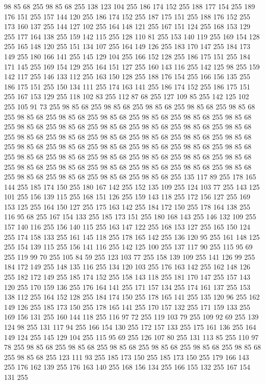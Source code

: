 98 85 68 255 98 85 68 255 138 123 104 255 186 174 152 255 188 177 154 255 189 176 151 255 157 144 120 255 186 174 152 255 187 175 151 255 188 176 152 255 173 160 137 255 144 127 102 255 164 148 121 255 167 151 124 255 168 153 129 255 177 164 138 255 159 142 115 255 128 110 81 255 153 140 119 255 169 154 128 255 165 148 120 255 151 134 107 255 164 149 126 255 183 170 147 255 184 173 149 255 180 166 141 255 145 129 104 255 166 152 128 255 186 175 151 255 184 171 145 255 169 154 129 255 164 151 127 255 160 143 116 255 142 125 98 255 159 142 117 255 146 133 112 255 163 150 128 255 188 176 154 255 166 156 135 255 186 175 151 255 150 134 111 255 174 163 141 255 186 174 152 255 186 175 151 255 167 153 129 255 118 102 83 255 112 87 68 255 127 109 85 255 142 125 102 255 105 91 73 255 98 85 68 255 98 85 68 255 98 85 68 255 98 85 68 255 98 85 68 255 98 85 68 255 98 85 68 255 98 85 68 255 98 85 68 255 98 85 68 255 98 85 68 255 98 85 68 255 98 85 68 255 98 85 68 255
98 85 68 255 98 85 68 255 98 85 68 255 98 85 68 255 98 85 68 255 98 85 68 255 98 85 68 255 98 85 68 255 98 85 68 255 98 85 68 255 98 85 68 255 98 85 68 255 98 85 68 255 98 85 68 255 98 85 68 255 98 85 68 255 98 85 68 255 98 85 68 255 98 85 68 255 98 85 68 255 98 85 68 255 98 85 68 255 98 85 68 255 98 85 68 255 98 85 68 255 98 85 68 255 98 85 68 255 98 85 68 255 98 85 68 255 98 85 68 255 98 85 68 255 135 117 89 255 178 165 144 255 185 174 150 255 180 167 142 255 152 135 109 255 124 103 77 255 143 125 101 255 156 139 115 255 168 151 126 255 159 143 118 255 172 156 127 255 169 153 125 255 164 150 127 255 175 163 142 255 184 172 150 255 178 164 138 255 116 95 68 255 167 154 133 255 185 173 151 255 180 168 143 255 146 132 109 255 157 140 116 255 156 140 115 255 163 147 122 255 168 153 127 255 165 150 124 255 174 158 133 255 161 145 118 255 178 165 142 255 136 120 95 255 161 148 125 255 154 139 115 255 156 141 116 255
142 125 100 255 137 117 90 255 115 95 69 255 119 99 70 255 105 84 59 255 123 103 77 255 158 139 109 255 141 126 99 255 184 172 149 255 148 135 116 255 134 120 103 255 176 163 142 255 162 148 126 255 182 172 149 255 185 174 152 255 158 143 118 255 181 170 147 255 157 143 120 255 170 159 136 255 176 164 141 255 171 157 134 255 174 161 137 255 153 138 112 255 164 152 128 255 184 174 150 255 178 165 141 255 135 120 96 255 162 149 126 255 185 173 150 255 178 165 141 255 170 157 132 255 171 159 133 255 169 156 131 255 160 144 118 255 116 97 72 255 119 103 79 255 109 92 69 255 139 124 98 255 131 117 94 255 166 154 130 255 172 157 133 255 175 161 136 255 164 149 124 255 145 129 104 255 115 95 69 255 126 107 80 255 131 113 85 255 110 97 78 255 98 85 68 255 98 85 68 255 98 85 68 255 98 85 68 255 98 85 68 255 98 85 68 255 98 85 68 255 123 111 93 255 185 173 150 255 185 173 150 255 179 166 143 255 176 162 139 255 176 163 140 255 168 156 134 255 166 155 132 255 167 154 131 255
